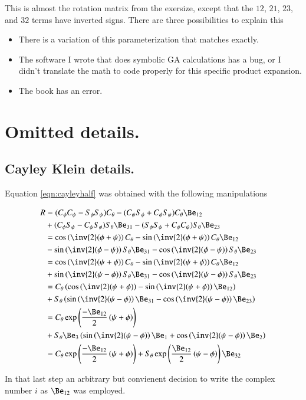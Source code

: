 \documentclass{article}
\begin{document}
This is almost the rotation matrix from the exersize, except that the $12$, $21$, $23$, and $32$ terms have inverted signs.  There are three possibilities to explain this

\begin{itemize}
\item There is a variation of this parameterization that matches exactly.
\item The software I wrote that does symbolic GA calculations has a bug, or I didn't translate the math to code properly for this
specific product expansion.
\item The book has an error.
\end{itemize}

\section{ Omitted details. }
\subsection{ Cayley Klein details. }

Equation \ref{eqn:cayleyhalf} was obtained with the following manipulations

\begin{align*}
R 
&=
( C_\phi C_\psi - S_\phi S_\psi ) C_\theta 
- ( C_\psi S_\phi + C_\phi S_\psi ) C_\theta \Be_{12} \\
&+ ( C_\phi S_\psi - C_\psi S_\phi ) S_\theta \Be_{31} 
- ( S_\phi S_\psi + C_\phi C_\psi ) S_\theta \Be_{23}  \\
&=
\cos\left(\inv{2}(\phi+\psi)\right) C_\theta 
-\sin\left(\inv{2}(\phi + \psi)\right) C_\theta \Be_{12} \\
&- \sin\left(\inv{2}(\phi - \psi)\right) S_\theta \Be_{31} 
- \cos\left(\inv{2}(\phi - \psi)\right) S_\theta \Be_{23} \\
&=
\cos\left(\inv{2}(\psi+\phi)\right) C_\theta 
-\sin\left(\inv{2}(\psi + \phi)\right) C_\theta \Be_{12} \\
&+ \sin\left(\inv{2}(\psi - \phi)\right) S_\theta \Be_{31} 
- \cos\left(\inv{2}(\psi - \phi)\right) S_\theta \Be_{23} \\
&=
C_\theta \left(
\cos\left(\inv{2}(\psi+\phi)\right) 
-\sin\left(\inv{2}(\psi + \phi)\right) \Be_{12} 
\right) \\
&+ 
S_\theta \left(
\sin\left(\inv{2}(\psi - \phi)\right) 
\Be_{31} 
- \cos\left(\inv{2}(\psi - \phi)\right) \Be_{23} \right) \\
&=
C_\theta 
\exp\left(
\frac{- \Be_{12} }{2}\left(\psi+\phi\right) 
\right)
\\
&+ 
S_\theta \Be_{3} 
\left(
\sin\left(\inv{2}(\psi - \phi)\right) 
\Be_{1} 
+ \cos\left(\inv{2}(\psi - \phi)\right) \Be_{2} \right) \\
&=
C_\theta 
\exp\left(
\frac{- \Be_{12} }{2}\left(\psi+\phi\right) 
\right)
+ 
S_\theta
\exp\left(
\frac{\Be_{12} }{2}\left(\psi-\phi\right) 
\right)
\Be_{32} \\
\end{align*}

In that last step an arbitrary but convienent decision to write the complex number $i$ as $\Be_{12}$ was employed.



\end{document}
